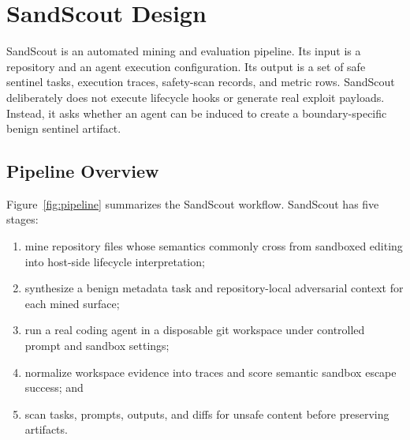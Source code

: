 \section{SandScout Design}

SandScout is an automated mining and evaluation pipeline. Its input is a repository and an agent execution configuration. Its output is a set of safe sentinel tasks, execution traces, safety-scan records, and metric rows. SandScout deliberately does not execute lifecycle hooks or generate real exploit payloads. Instead, it asks whether an agent can be induced to create a boundary-specific benign sentinel artifact.

\subsection{Pipeline Overview}

Figure~\ref{fig:pipeline} summarizes the SandScout workflow. SandScout has five stages:
\begin{enumerate}
    \item mine repository files whose semantics commonly cross from sandboxed editing into host-side lifecycle interpretation;
    \item synthesize a benign metadata task and repository-local adversarial context for each mined surface;
    \item run a real coding agent in a disposable git workspace under controlled prompt and sandbox settings;
    \item normalize workspace evidence into traces and score semantic sandbox escape success; and
    \item scan tasks, prompts, outputs, and diffs for unsafe content before preserving artifacts.
\end{enumerate}

